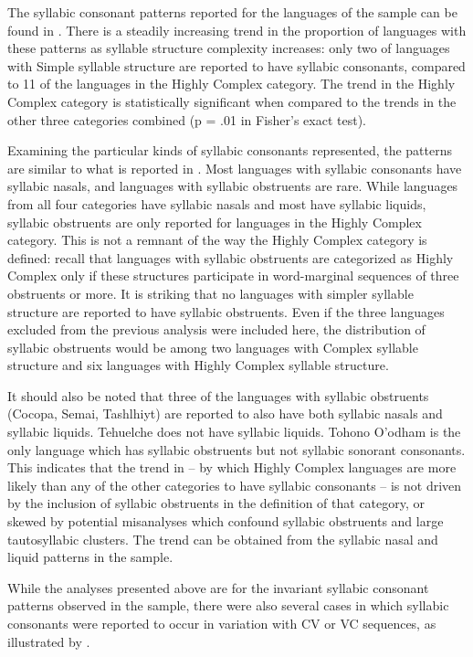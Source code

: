   The syllabic consonant patterns reported for the languages of the sample can be found in . There is a steadily increasing trend in the proportion of languages with these patterns as syllable structure complexity increases: only two of languages with Simple syllable structure are reported to have syllabic consonants, compared to 11 of the languages in the Highly Complex category. The trend in the Highly Complex category is statistically significant when compared to the trends in the other three categories combined (p = .01 in Fisher’s exact test). 
  
  Examining the particular kinds of syllabic consonants represented, the patterns are similar to what is reported in \citet{Bell1978a}. Most languages with syllabic consonants have syllabic nasals, and languages with syllabic obstruents are rare. While languages from all four categories have syllabic nasals and most have syllabic liquids, syllabic obstruents are only reported for languages in the Highly Complex category. This is not a remnant of the way the Highly Complex category is defined: recall that languages with syllabic obstruents are categorized as Highly Complex only if these structures participate in word-marginal sequences of three obstruents or more. It is striking that no languages with simpler syllable structure are reported to have syllabic obstruents. Even if the three languages excluded from the previous analysis were included here, the distribution of syllabic obstruents would be among two languages with Complex syllable structure and six languages with Highly Complex syllable structure. 

  It should also be noted that three of the languages with syllabic obstruents (Cocopa, Semai, Tashlhiyt) are reported to also have both syllabic nasals and syllabic liquids. Tehuelche does not have syllabic liquids. Tohono O’odham is the only language which has syllabic obstruents but not syllabic sonorant consonants. This indicates that the trend in  -- by which Highly Complex languages are more likely than any of the other categories to have syllabic consonants  -- is not driven by the inclusion of syllabic obstruents in the definition of that category, or skewed by potential misanalyses which confound syllabic obstruents and large tautosyllabic clusters. The trend can be obtained from the syllabic nasal and liquid patterns in the sample.

  While the analyses presented above are for the invariant syllabic consonant patterns observed in the sample, there were also several cases in which syllabic consonants were reported to occur in variation with CV or VC sequences, as illustrated by .


